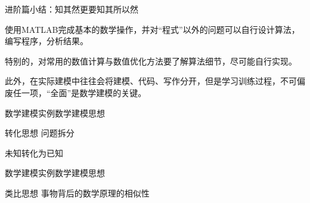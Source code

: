 \documentclass{beamer}
\begin{document}
\begin{frame}{进阶篇}{小结：知其然更要知其所以然}

使用MATLAB完成基本的数学操作，并对“程式”以外的问题可以自行设计算法，编写程序，分析结果。

特别的，对常用的数值计算与数值优化方法要了解算法细节，尽可能自行实现。

此外，在实际建模中往往会将建模、代码、写作分开，但是学习训练过程，不可偏废任一项，“全面”是数学建模的关键。

\end{frame}

\begin{frame}{数学建模实例}{数学建模思想}
\begin{block}{转化思想}
问题拆分

未知转化为已知
\end{block}
\end{frame}


\begin{frame}{数学建模实例}{数学建模思想}
\begin{block}{类比思想}
事物背后的数学原理的相似性
\begin{figure}
\label{fig:subfig} 
\end{figure}
\end{block}
\end{frame}
\end{document}
